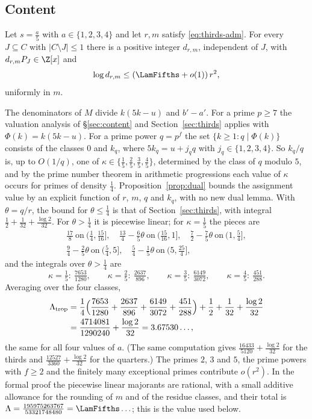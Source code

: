 \subsection{Content}
\begin{theorem}[content]\label{thm:content-fifths}
Let $s=\frac a5$ with $a\in\{1,2,3,4\}$ and let $r,m$ satisfy \eqref{eq:thirds-adm}. For every $J\subseteq C$ with $|C\setminus J|\le1$
there is a positive integer $d_{r,m}$, independent of $J$, with $d_{r,m}P_J\in\Z[x]$ and
\[
 \log d_{r,m}\le(\LamFifths+o(1))\,r^2,
\]
uniformly in $m$.
\end{theorem}

The denominators of $M$ divide $k(5k-u)$ and $b'-a'$. For a prime $p\ge7$ the valuation analysis of \S\ref{sec:content} and
Section~\ref{sec:thirds} applies with $\Phi(k)=k(5k-u)$. For a prime power $q=p^f$ the set $\{k\ge1:q\mid\Phi(k)\}$ consists of the
classes $0$ and $k_q$, where $5k_q=u+j_qq$ with $j_q\in\{1,2,3,4\}$. So $k_q/q$ is, up to $O(1/q)$, one of
$\kappa\in\{\frac15,\frac25,\frac35,\frac45\}$, determined by the class of $q$ modulo $5$, and by the prime number theorem in
arithmetic progressions each value of $\kappa$ occurs for primes of density $\frac14$. Proposition~\ref{prop:dual} bounds the
assignment value by an explicit function of $r$, $m$, $q$ and $k_q$, with no new dual lemma. With $\theta=q/r$, the bound for
$\theta\le\frac14$ is that of Section~\ref{sec:thirds}, with integral $\frac12+\frac1{32}+\frac{\log2}{32}$. For $\theta>\frac14$
it is piecewise linear; for $\kappa=\frac15$ the pieces are
\[
\begin{gathered}
 \tfrac{17}8\ \text{on}\ \bigl(\tfrac14,\tfrac{15}{16}\bigr],\quad
 \tfrac{13}4-\tfrac65\theta\ \text{on}\ \bigl(\tfrac{15}{16},1\bigr],\quad
 \tfrac72-\tfrac75\theta\ \text{on}\ \bigl(1,\tfrac54\bigr],\\
 \tfrac94-\tfrac25\theta\ \text{on}\ \bigl(\tfrac54,5\bigr],\quad
 \tfrac54-\tfrac15\theta\ \text{on}\ \bigl(5,\tfrac{25}4\bigr],
\end{gathered}
\]
and the integrals over $\theta>\frac14$ are
\[
 \kappa=\tfrac15:\ \tfrac{7653}{1280},\qquad
 \kappa=\tfrac25:\ \tfrac{2637}{896},\qquad
 \kappa=\tfrac35:\ \tfrac{6149}{3072},\qquad
 \kappa=\tfrac45:\ \tfrac{451}{288}.
\]
Averaging over the four classes,
\[
\begin{aligned}
 \Lambda_{\rm trop}&=\frac14\Bigl(\frac{7653}{1280}+\frac{2637}{896}+\frac{6149}{3072}+\frac{451}{288}\Bigr)
 +\frac12+\frac1{32}+\frac{\log2}{32}\\
 &=\frac{4714081}{1290240}+\frac{\log2}{32}=3.67530\ldots,
\end{aligned}
\]
the same for all four values of $a$. (The same computation gives $\frac{16433}{5120}+\frac{\log 2}{32}$ for the thirds and $\frac{12527}{3360}+\frac{\log 2}{32}$ for
the quarters.) The primes $2$, $3$ and $5$, the prime powers with $f\ge2$ and the finitely many exceptional primes contribute $o(r^2)$. In the formal proof
the piecewise linear majorants are rational, with a small additive allowance for the rounding of $m$ and of the residue classes,
and their total is $\Lambda=\frac{195975263767}{53321748480}=\LamFifths\ldots$; this is the value used below.

